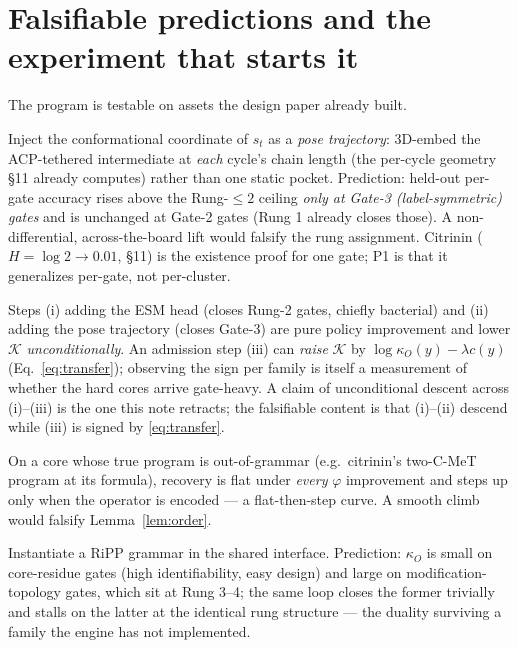 \documentclass[11pt]{article}
\theoremstyle{plain}
\theoremstyle{definition}
\newcommand{\kO}{\kappa_{O}}
\begin{document}
\section{Falsifiable predictions and the experiment that starts it}
\label{sec:falsify}
The program is testable on assets the design paper already built.
\begin{description}[leftmargin=2.2em,itemsep=2pt]
\item[P1 (Gate-3-specific lift --- the first measurable breakthrough).] Inject the conformational coordinate of $s_t$ as a \emph{pose trajectory}: 3D-embed the ACP-tethered intermediate at \emph{each} cycle's chain length (the per-cycle geometry \S11 already computes) rather than one static pocket. Prediction: held-out per-gate accuracy rises above the Rung-$\le 2$ ceiling \emph{only at Gate-3 (label-symmetric) gates} and is unchanged at Gate-2 gates (Rung 1 already closes those). A non-differential, across-the-board lift would falsify the rung assignment. Citrinin ($H=\log 2\to 0.01$, \S11) is the existence proof for one gate; P1 is that it generalizes per-gate, not per-cluster.
\item[P2 ($\mathcal{K}$ behaviour, with the $\lambda$-caveat).] Steps (i) adding the ESM head (closes Rung-2 gates, chiefly bacterial) and (ii) adding the pose trajectory (closes Gate-3) are pure policy improvement and lower $\mathcal{K}$ \emph{unconditionally}. An admission step (iii) can \emph{raise} $\mathcal{K}$ by $\log\kO(y)-\lambda c(y)$ (Eq.~\eqref{eq:transfer}); observing the sign per family is itself a measurement of whether the hard cores arrive gate-heavy. A claim of unconditional descent across (i)--(iii) is the one this note retracts; the falsifiable content is that (i)--(ii) descend while (iii) is signed by \eqref{eq:transfer}.
\item[P3 (coverage-gates step).] On a core whose true program is out-of-grammar (e.g.\ citrinin's two-C-MeT program at its formula), recovery is flat under \emph{every} $\varphi$ improvement and steps up only when the operator is encoded --- a flat-then-step curve. A smooth climb would falsify Lemma~\ref{lem:order}.
\item[P4 (RiPP transfer, from Corollary~3, 2026a).] Instantiate a RiPP grammar in the shared interface. Prediction: $\kO$ is small on core-residue gates (high identifiability, easy design) and large on modification-topology gates, which sit at Rung 3--4; the same loop closes the former trivially and stalls on the latter at the identical rung structure --- the duality surviving a family the engine has not implemented.
\end{description}
\end{document}
